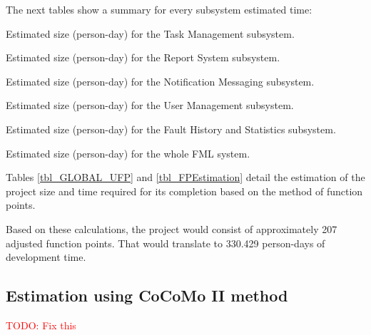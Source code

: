 The next tables show a summary for every subsystem estimated time:

\begin{table}[hbtp]
\centering

\caption{Estimated size (person-day) for the Task Management subsystem.}
\end{table}

\begin{table}[hbtp]
\centering

\caption{Estimated size (person-day) for the Report System subsystem.}
\end{table}

\begin{table}[hbtp]
\centering

\caption{Estimated size (person-day) for the Notification Messaging subsystem.}
\end{table}

\begin{table}[hbtp]
\centering

\caption{Estimated size (person-day) for the User Management subsystem.}
\end{table}

\begin{table}[hbtp]
\centering

\caption{Estimated size (person-day) for the Fault History and Statistics subsystem.}
\end{table}

\begin{table}[hbtp]
\centering

\caption{Estimated size (person-day) for the whole FML system.}
\label{tbl_FPEstimation}
\end{table}

Tables \ref{tbl_GLOBAL_UFP} and \ref{tbl_FPEstimation} detail the estimation of the project size and time required for its completion based on the method of function points.

Based on these calculations, the project would consist of approximately 207 adjusted function points. That would translate to 330.429 person-days of development time.

\subsection{Estimation using CoCoMo II method}

\textcolor{red}{TODO: Fix this}

